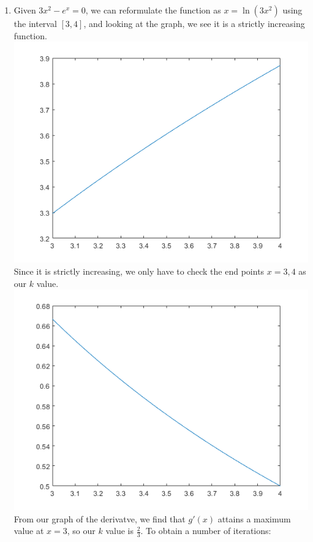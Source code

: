 \documentclass[12pt,letterpaper]{article}
\begin{document}
\begin{enumerate}
\begin{enumerate}
      \item 
      Given $3x^2 - e^x = 0$, we can reformulate the function as $x = \ln(3x^2)$ using 
      the interval $[3, 4]$, 
      and looking at the graph, we see it is a strictly increasing function. 
      \includegraphics{number2bgraph.png}\\
      Since it is strictly increasing, we only have to check the end points $x = 3,4$ 
      as our $k$ value.\\
      \includegraphics{number2bgraphb.png} \\
      From our graph of the derivatve, we find that $g'(x)$ attains a maximum value 
      at $x = 3$, so our $k$ value is $\frac{2}{3}$. To obtain a number of iterations: 

\end{enumerate}
\end{enumerate}
\end{document}

